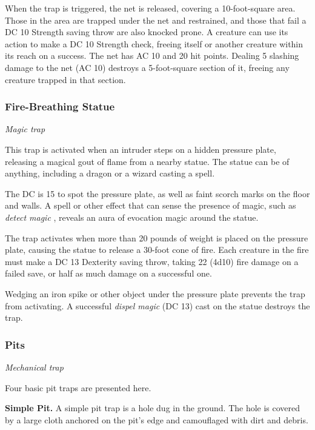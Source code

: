 \documentclass[
]{article}
\begin{document}
When the trap is triggered, the net is released, covering a
10-foot-square area. Those in the area are trapped under the net and
restrained, and those that fail a DC 10 Strength saving throw are also
knocked prone. A creature can use its action to make a DC 10 Strength
check, freeing itself or another creature within its reach on a success.
The net has AC 10 and 20 hit points. Dealing 5 slashing damage to the
net (AC 10) destroys a 5-foot-square section of it, freeing any creature
trapped in that section.

\hypertarget{fire-breathing-statue}{%
\subsubsection{Fire-Breathing Statue}\label{fire-breathing-statue}}

\emph{Magic trap}

This trap is activated when an intruder steps on a hidden pressure
plate, releasing a magical gout of flame from a nearby statue. The
statue can be of anything, including a dragon or a wizard casting a
spell.

The DC is 15 to spot the pressure plate, as well as faint scorch marks
on the floor and walls. A spell or other effect that can sense the
presence of magic, such as \emph{detect magic} , reveals an aura of
evocation magic around the statue.

The trap activates when more than 20 pounds of weight is placed on the
pressure plate, causing the statue to release a 30-foot cone of fire.
Each creature in the fire must make a DC 13 Dexterity saving throw,
taking 22 (4d10) fire damage on a failed save, or half as much damage on
a successful one.

Wedging an iron spike or other object under the pressure plate prevents
the trap from activating. A successful \emph{dispel magic} (DC 13) cast
on the statue destroys the trap.

\hypertarget{pits}{%
\subsubsection{Pits}\label{pits}}

\emph{Mechanical trap}

Four basic pit traps are presented here.

\textbf{Simple Pit.} A simple pit trap is a hole dug in the ground. The
hole is covered by a large cloth anchored on the pit's edge and
camouflaged with dirt and debris.
\end{document}
